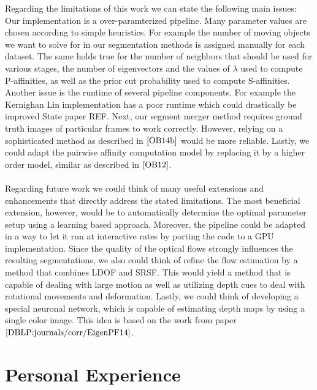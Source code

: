 Regarding the limitations of this work we can state the following main issues: Our implementation is a over-paramterized pipeline. Many parameter values are chosen according to simple heuristics. For example the number of moving objects we want to solve for in our segmentation methods is assigned manually for each dataset. The same holds true for the number of neighbors that should be used for various stages, the number of eigenvectors and the values of $\lambda$ used to compute P-affinities, as well as the prior cut probability used to compute S-affinities. Another issue is the runtime of several pipeline components. For example the Kernighan Lin implementation has a poor runtime which could drastically be improved State paper REF. Next, our segment merger method requires ground truth images of particular frames to work correctly. However, relying on a sophisticated method as described in $\cite{OB14b}$ would be more reliable. Lastly, we could adapt the pairwise affinity computation model by replacing it by a higher order model, similar as described in $\cite{OB12}$. \\ \\
Regarding future work we could think of many useful extensions and enhancements that directly address the stated limitations. The most beneficial extension, however, would be to automatically determine the optimal parameter setup using a learning based approach. Moreover, the pipeline could be adapted in a way to let it run at interactive rates by porting the code to a GPU implementation. Since the quality of the optical flows strongly influences the resulting segmentations, we also could think of refine the flow estimation by a method that combines LDOF and SRSF. This would yield a method that is capable of dealing with large motion as well as utilizing depth cues to deal with rotational movements and deformation. Lastly, we could think of developing a special neuronal network, which is capable of estimating depth maps by using a single color image. This idea is based on the work from paper $\cite{DBLP:journals/corr/EigenPF14}$.  

\section{Personal Experience}

